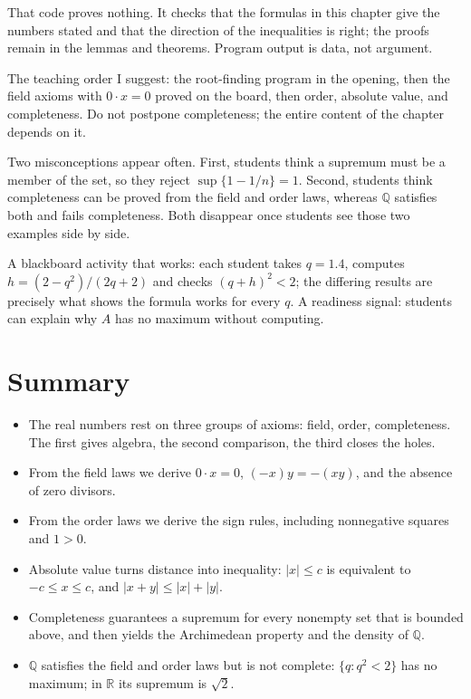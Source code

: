 That code proves nothing. It checks that the formulas in this chapter give the numbers
stated and that the direction of the inequalities is right; the proofs remain in the
lemmas and theorems. Program output is data, not argument.

\begin{untukdosen}
The teaching order I suggest: the root-finding program in the opening, then the field
axioms with $0\cdot x=0$ proved on the board, then order, absolute value, and
completeness. Do not postpone completeness; the entire content of the chapter depends on
it.

Two misconceptions appear often. First, students think a supremum must be a member of
the set, so they reject $\sup\{1-1/n\}=1$. Second, students think completeness can be
proved from the field and order laws, whereas $\mathbb{Q}$ satisfies both and fails
completeness. Both disappear once students see those two examples side by side.

A blackboard activity that works: each student takes $q=1.4$, computes
$h=(2-q^2)/(2q+2)$ and checks $(q+h)^2<2$; the differing results are precisely what
shows the formula works for every $q$. A readiness signal: students can explain why $A$
has no maximum without computing.
\end{untukdosen}

\section{Summary}

\begin{ringkasan}
\begin{itemize}
\item The real numbers rest on three groups of axioms: field, order, completeness.
      The first gives algebra, the second comparison, the third closes the holes.
\item From the field laws we derive $0\cdot x=0$, $(-x)y=-(xy)$, and the absence of
      zero divisors.
\item From the order laws we derive the sign rules, including nonnegative squares and
      $1>0$.
\item Absolute value turns distance into inequality: $|x|\le c$ is equivalent to
      $-c\le x\le c$, and $|x+y|\le|x|+|y|$.
\item Completeness guarantees a supremum for every nonempty set that is bounded above,
      and then yields the Archimedean property and the density of $\mathbb{Q}$.
\item $\mathbb{Q}$ satisfies the field and order laws but is not complete:
      $\{q: q^2<2\}$ has no maximum; in $\mathbb{R}$ its supremum is $\sqrt{2}$.
\end{itemize}
\end{ringkasan}

